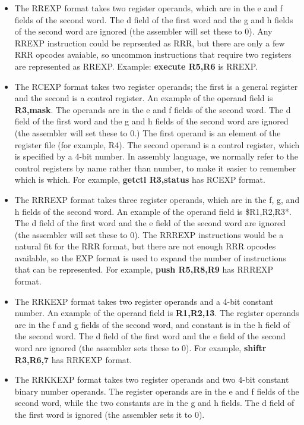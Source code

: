 \documentclass[11pt]{article}
\begin{document}
\begin{itemize}
\item The RREXP format takes two register operands, which are in the e and
f fields of the second word. The d field of the first word and the g
and h fields of the second word are ignored (the assembler will set
these to 0).  Any RREXP instruction could be reprsented as RRR, but
there are only a few RRR opcodes avaiable, so uncommon instructions
that require two registers are represented as RREXP.  Example:
\textbf{execute R5,R6} is RREXP.

\item The RCEXP format takes two register operands; the first is a general
register and the second is a control register.  An example of the
operand field is \textbf{R3,mask}.  The operands are in the e and f fields
of the second word.  The d field of the first word and the g and h
fields of the second word are ignored (the assembler will set these
to 0.)  The first operand is an element of the register file (for
example, R4).  The second operand is a control register, which is
specified by a 4-bit number.  In assembly language, we normally
refer to the control registers by name rather than number, to make
it easier to remember which is which.  For example, \textbf{getctl
R3,status} has RCEXP format.

\item The RRREXP format takes three register operands, which are in the f,
g, and h fields of the second word. An example of the operand field
is \$R1,R2,R3*.  The d field of the first word and the e field of the
second word are ignored (the assembler will set these to 0).  The
RRREXP instructions would be a natural fit for the RRR format, but
there are not enough RRR opcodes available, so the EXP format is
used to expand the number of instructions that can be represented.
For example, \textbf{push R5,R8,R9} has RRREXP format.

\item The RRKEXP format takes two register operands and a 4-bit constant
number.  An example of the operand field is \textbf{R1,R2,13}.  The
register operands are in the f and g fields of the second word, and
constant is in the h field of the second word.  The d field of the
first word and the e field of the second word are ignored (the
assembler sets these to 0).  For example, \textbf{shiftr R3,R6,7} has
RRKEXP format.

\item The RRKKEXP format takes two register operands and two 4-bit
constant binary number operands.  The register operands are in the e
and f fields of the second word, while the two constants are in the
g and h fields.  The d field of the first word is ignored (the
assembler sets it to 0).


\end{itemize}
\end{document}
